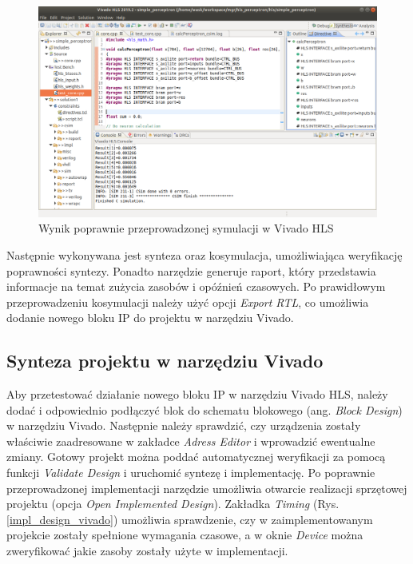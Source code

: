 \begin{figure}[!h]
  \centering
  \includegraphics[width=\textwidth]{img/vivado_hls_sim.png}
  \caption{Wynik poprawnie przeprowadzonej symulacji w Vivado HLS}
  \label{hls_design_sim}
\end{figure}


Następnie wykonywana jest synteza oraz kosymulacja, umożliwiająca 
weryfikację poprawności syntezy. Ponadto narzędzie generuje raport, który przedstawia
informacje na temat zużycia zasobów i opóźnień czasowych. Po prawidłowym 
przeprowadzeniu kosymulacji należy użyć opcji \emph{Export RTL}, co umożliwia 
dodanie nowego bloku IP do projektu w narzędziu Vivado.

\subsection{Synteza projektu w narzędziu Vivado}

Aby przetestować działanie nowego bloku IP w narzędziu Vivado HLS, należy dodać i odpowiednio podłączyć blok do 
schematu blokowego (ang. \emph{Block Design}) w narzędziu Vivado. Następnie należy sprawdzić, czy urządzenia zostały 
właściwie zaadresowane w zakładce \emph{Adress Editor} i wprowadzić ewentualne zmiany. Gotowy projekt można poddać 
automatycznej weryfikacji za pomocą funkcji \emph{Validate Design} i uruchomić syntezę i implementację. Po poprawnie 
przeprowadzonej implementacji narzędzie umożliwia otwarcie realizacji sprzętowej projektu (opcja \emph{Open Implemented 
Design}). Zakładka \emph{Timing} (Rys. \ref{impl_design_vivado}) umożliwia sprawdzenie, czy w zaimplementowanym 
projekcie zostały spełnione wymagania czasowe, a w oknie \emph{Device} można zweryfikować jakie zasoby zostały użyte w 
implementacji.

